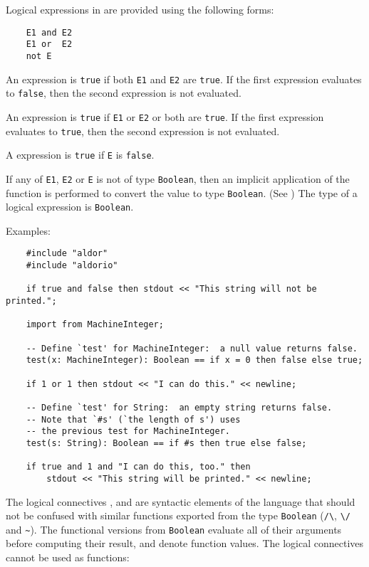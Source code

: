 Logical expressions in \asharp{} are provided using the following forms:


\begin{small}
\begin{verbatim}
    E1 and E2
    E1 or  E2
    not E
\end{verbatim}
\end{small}

An  expression is \verb"true" if both \verb"E1" and \verb"E2" are
\verb"true".  If the first expression evaluates to \verb"false", then
the second expression is not evaluated.

An  expression is \verb"true" if \verb"E1" or \verb"E2" or
both are \verb"true".  If the first expression evaluates to \verb"true",
then the second expression is not evaluated.

A  expression is \verb"true" if \verb"E" is \verb"false".

If any of \verb"E1", \verb"E2" or \verb"E" is not of type \verb"Boolean",
then an implicit application of the function  is performed
to convert the value to type \verb"Boolean".  (See )
The type of a logical expression is \verb"Boolean".

Examples:

\begin{small}
\begin{verbatim}
    #include "aldor"
    #include "aldorio"

    if true and false then stdout << "This string will not be printed.";

    import from MachineInteger;

    -- Define `test' for MachineInteger:  a null value returns false.
    test(x: MachineInteger): Boolean == if x = 0 then false else true;

    if 1 or 1 then stdout << "I can do this." << newline;

    -- Define `test' for String:  an empty string returns false.
    -- Note that `#s' (`the length of s') uses
    -- the previous test for MachineInteger.
    test(s: String): Boolean == if #s then true else false;

    if true and 1 and "I can do this, too." then
        stdout << "This string will be printed." << newline;
\end{verbatim}
\end{small}
The logical connectives ,  and  are
syntactic elements of the language that should not be confused with
similar functions exported from the type \verb"Boolean"
(\verb"/\", \verb"\/" and \verb"~").  The functional versions from
\verb"Boolean" evaluate all of their arguments before computing their
result, and denote function values.  The logical connectives cannot be
used as functions:

